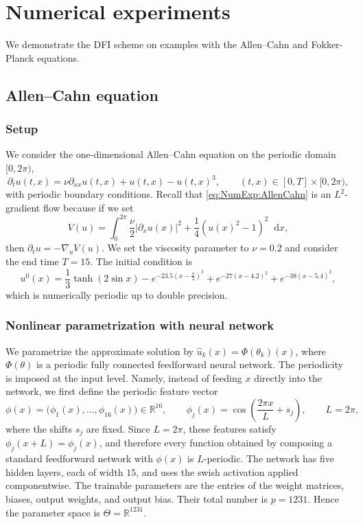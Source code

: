 \documentclass[oneside,11pt]{article}
\theoremstyle{remark}
\theoremstyle{thmstyleone}
\theoremstyle{thmstylethree}
\theoremstyle{thmstyletwo}
\newcommand{\abs}[1]{\lvert #1\rvert}
\newcommand*\dif{\mathop{}\!\mathrm{d}}
\begin{document}
\section{Numerical experiments}
\label{sec:numerics}
We demonstrate the DFI scheme on examples with the Allen--Cahn and Fokker-Planck equations.

\subsection{Allen--Cahn equation}
\label{sec:numexp_allen_cahn}

\subsubsection{Setup}
We consider the one-dimensional Allen--Cahn equation on the periodic domain $[0,2\pi)$,
\begin{equation}\label{eq:NumExp:AllenCahn}
    \partial_t u(t,x)
    =
    \nu \partial_{xx} u(t,x)+u(t,x)-u(t,x)^3,
    \qquad
    (t,x)\in[0,T]\times[0,2\pi),
\end{equation}
with periodic boundary conditions. Recall that \eqref{eq:NumExp:AllenCahn} is an $L^2$-gradient flow because if we set
\begin{equation*}
    V(u)
    =
    \int_0^{2\pi}
    \frac{\nu}{2}\abs{\partial_x u(x)}^2
    +
    \frac{1}{4}\left(u(x)^2-1\right)^2
    \dif x,
\end{equation*}
then $\partial_t u = -\nabla_u V(u)$. We set the viscosity parameter to $\nu=0.2$ and consider the end time $T=15$. The initial condition is
\begin{equation*}
    u^0(x)
    =
    \frac{1}{3}\tanh(2\sin x)
    -e^{-23.5\left(x-\frac{\pi}{2}\right)^2}
    +e^{-27(x-4.2)^2}
    +e^{-38(x-5.4)^2},
\end{equation*}
which is numerically periodic up to double precision.

\subsubsection{Nonlinear parametrization with neural network}\label{sec:NumExp:AC:DNNSetup}
We parametrize the approximate solution by $\hat u_k(x)=\Phi(\theta_k)(x)$,  where $\Phi(\theta)$ is a periodic fully connected feedforward neural network.  The periodicity is imposed at the input level. Namely, instead of feeding $x$ directly into the network, we first define the periodic feature vector
\[
    \phi(x)
    =
    \bigl(\phi_1(x),\ldots,\phi_{16}(x)\bigr)\in\mathbb R^{16},
    \qquad
    \phi_j(x)
    =
    \cos\left(\frac{2\pi x}{L}+s_j\right),
    \qquad
    L=2\pi,
\]
where the shifts $s_j$ are fixed. Since $L=2\pi$, these features satisfy $\phi_j(x+L)=\phi_j(x)$, and therefore every function obtained by composing a standard feedforward network with $\phi(x)$ is $L$-periodic. The network has five hidden layers, each of width $15$, and uses the swish activation applied componentwise. The trainable parameters are the entries of the weight matrices, biases, output weights, and output bias. Their total number is $p = 1231$. Hence the parameter space is $\Theta=\mathbb R^{1231}$.
\end{document}
